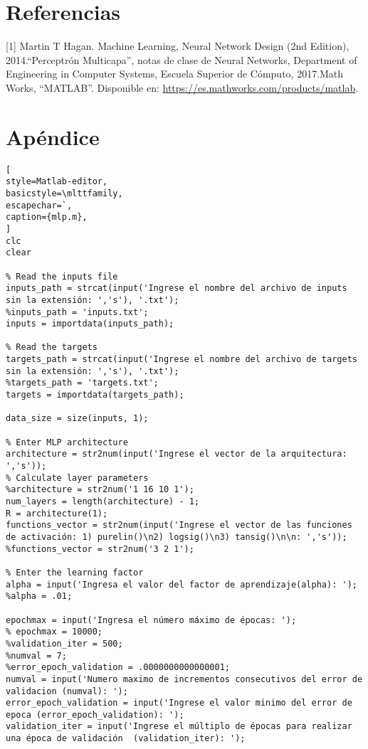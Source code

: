 \documentclass[6pt]{article}
\begin{document}
\section{Referencias}
[1] Martin T Hagan. Machine Learning, Neural Network Design (2nd Edition), 2014.\newline
[2] ``Perceptrón Multicapa'', notas de clase de Neural Networks, Department of Engineering in Computer Systems, Escuela Superior de Cómputo, 2017.\newline
[3] Math Works, “MATLAB”. Disponible en: \url{https://es.mathworks.com/products/matlab}.

\section{Apéndice}
\begin{lstlisting}[
style=Matlab-editor,
basicstyle=\mlttfamily,
escapechar=`,
caption={mlp.m},
]
clc
clear

% Read the inputs file
inputs_path = strcat(input('Ingrese el nombre del archivo de inputs sin la extensión: ','s'), '.txt');
%inputs_path = 'inputs.txt';
inputs = importdata(inputs_path);

% Read the targets
targets_path = strcat(input('Ingrese el nombre del archivo de targets sin la extensión: ','s'), '.txt');
%targets_path = 'targets.txt';
targets = importdata(targets_path);

data_size = size(inputs, 1);

% Enter MLP architecture
architecture = str2num(input('Ingrese el vector de la arquitectura: ','s'));
% Calculate layer parameters
%architecture = str2num('1 16 10 1');
num_layers = length(architecture) - 1;
R = architecture(1);
functions_vector = str2num(input('Ingrese el vector de las funciones de activación: 1) purelin()\n2) logsig()\n3) tansig()\n\n: ','s'));
%functions_vector = str2num('3 2 1');

% Enter the learning factor
alpha = input('Ingresa el valor del factor de aprendizaje(alpha): ');
%alpha = .01;

epochmax = input('Ingresa el número máximo de épocas: ');
% epochmax = 10000;
%validation_iter = 500;
%numval = 7;
%error_epoch_validation = .0000000000000001;
numval = input('Numero maximo de incrementos consecutivos del error de validacion (numval): ');
error_epoch_validation = input('Ingrese el valor minimo del error de epoca (error_epoch_validation): ');
validation_iter = input('Ingrese el múltiplo de épocas para realizar una época de validación  (validation_iter): ');


\end{lstlisting}
\end{document}
